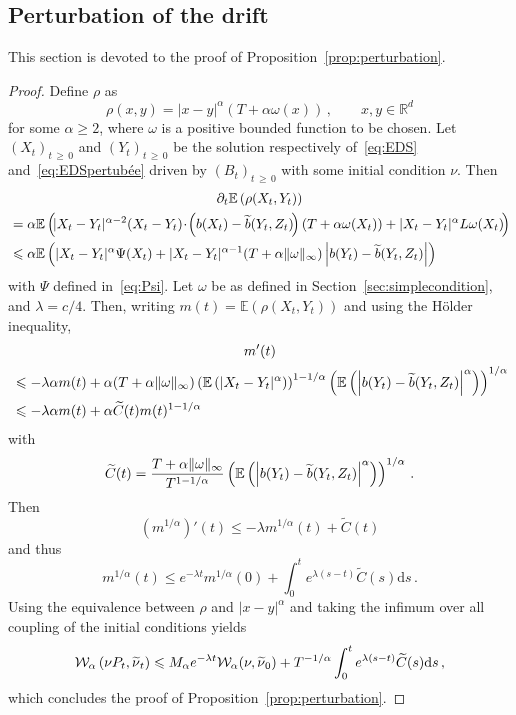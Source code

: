 \documentclass[AHL,Unicode,longabstracts,published]{cedram}
\newcommand{\R}{\mathbb R}
\newcommand{\bbE}{\mathbb E}
\newcommand{\clW}{\mathcal W}
\newcommand{\dd}{\mathrm{d}}
\newcommand{\1}{\mathbbm{1}}
\newcommand{\nv}[1]{#1}
\let\oldtilde\tilde
\renewcommand*{\tilde}[1]{\mathchoice{\widetilde{#1}}{\widetilde{#1}}{\oldtilde{#1}}{\oldtilde{#1}}}
\newcommand{\R}{\mathbb R}
\newcommand{\clW}{\mathcal W}
\begin{document}
\subsection{\nv{Perturbation} of the drift}\label{sec:perturbation}

This section is devoted to the proof of Proposition~\ref{prop:perturbation}.
\begin{proof}
Define $\rho$ as
\[
\rho(x,y) = |x-y|^\alpha \left( T+ \alpha \nv{\omega}(x)\right)\,,\qquad x,y\in\R^d
\]
for some $\alpha\geqslant 2$, where $\nv{\omega}$ is a positive bounded function to be chosen. Let $(X_t)_{t\,\geqslant\,0}$ and $(Y_t)_{t\,\geqslant \,0}$ be the solution respectively of~\eqref{eq:EDS} and~\eqref{eq:EDSpertubée} driven by $(B_t)_{t\,\geqslant\,0}$ with some initial condition $\nu$. Then
\begin{multline*}
\partial_t \bbE \left( \rho(X_t,Y_t) \right)\\
\begin{aligned}
& = \alpha \bbE\left(\!|X_t-Y_t|^{\alpha-2} (X_t-Y_t)\!\cdot\! \left( b(X_t) - \tilde b(Y_t,Z_t)\! \right) (T+\alpha \nv{\omega}(X_t)) + |X_t-Y_t|^\alpha L\nv{\omega}(X_t)\!\right) \\
& \leqslant \alpha \bbE \left( |X_t-Y_t|^\alpha \Psi(X_t) + |X_t-Y_t|^{\alpha-1}(T+\alpha\|\nv{\omega}\|_\infty) \left| b(Y_t) - \tilde b(Y_t,Z_t)\right|\right)
\end{aligned}
\end{multline*}
with $\Psi$ defined in~\eqref{eq:Psi}. Let $\nv{\omega}$ be as defined in Section~\ref{sec:simplecondition}, and $\lambda=c/4$. Then, writing $m(t)=\bbE \left( \rho(X_t,Y_t) \right)$ and using the Hölder inequality,
\begin{multline*}
m'(t)\\
\begin{aligned}
& \leqslant -\lambda \alpha m(t) + \alpha (T+\alpha\|\nv{\omega}\|_\infty) \left( \bbE \left( |X_t-Y_t|^{\alpha} \right) \right)^{1-1/\alpha}\left( \bbE \left(\left| b(Y_t) - \tilde b(Y_t,Z_t)\right|^\alpha\right)\right)^{1/\alpha} \\
& \leqslant -\lambda \alpha m(t) + \alpha \widetilde C(t) m(t)^{1-1/\alpha}
\end{aligned}
\end{multline*}
with
\[
\widetilde C(t) = \frac{T+\alpha\|\nv{\omega}\|_\infty}{T^{1-1/\alpha}} \left( \bbE \left(\left| b(Y_t) - \tilde b(Y_t,Z_t)\right|^\alpha\right)\right)^{1/\alpha}\,.
\]
Then
\[
\left(m^{1/\alpha}\right)'(t) \leqslant -\lambda m^{1/\alpha}(t) + \widetilde C(t)
\]
and thus
\[
m^{1/\alpha}(t) \leqslant e^{-\lambda t}m^{1/\alpha}(0) + \int_0^t e^{\lambda (s-t)}\widetilde C(s)\dd s\,.
\]
Using the equivalence between $\rho$ and $|x-y|^\alpha$ and taking the infimum over all coupling of the initial conditions yields
\[
\clW_\alpha\left(\nu P_t,\tilde \nu_t\right) \leqslant M_\alpha e^{-\lambda t} \clW_\alpha(\nu,\tilde \nu_0)+ T^{-1/\alpha} \int_0^t e^{\lambda (s-t)}\widetilde C(s)\dd s\,,
\]
which concludes the proof of Proposition~\ref{prop:perturbation}.
\end{proof}
\end{document}
